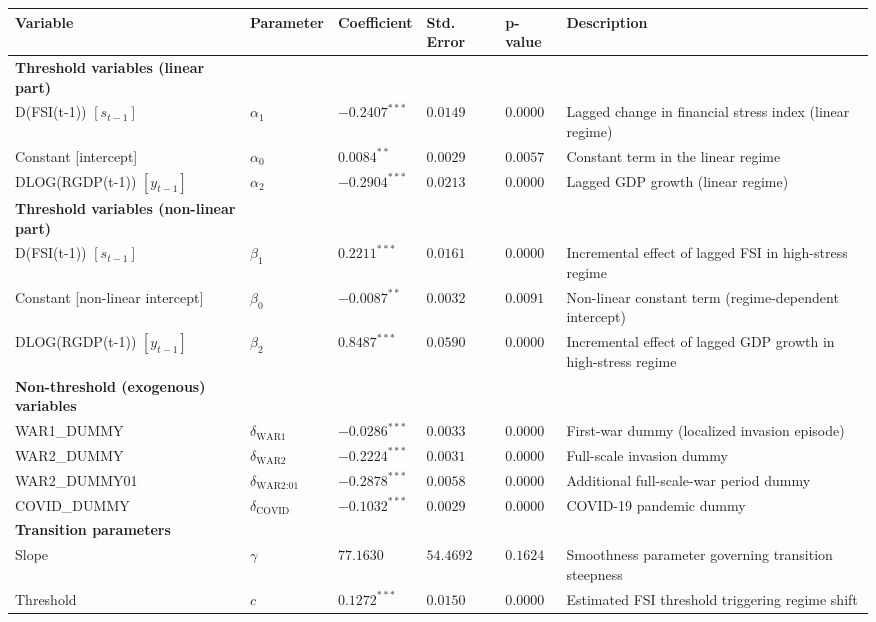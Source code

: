 \documentclass[12pt,preprint,aps,author-year]{revtex4-1}
\begin{document}
\begin{tabular}{|l|l|l|l|l|l|}
\hline
\textbf{Variable} & \textbf{Parameter} & \textbf{Coefficient} & \textbf{Std. Error} & \textbf{p-value} & \textbf{Description} \\ \hline
\textbf{Threshold variables (linear part)} &  &  &  &  &  \\ \hline
D(FSI(t-1)) $[s_{t-1}]$ & $\alpha_1$ & $-0.2407^{***}$ & $0.0149$ & $0.0000$ & Lagged change in financial stress index (linear regime) \\ \hline
Constant [intercept] & $\alpha_0$ & $0.0084^{**}$ & $0.0029$ & $0.0057$ & Constant term in the linear regime \\ \hline
DLOG(RGDP(t-1)) $[y_{t-1}]$ & $\alpha_2$ & $-0.2904^{***}$ & $0.0213$ & $0.0000$ & Lagged GDP growth (linear regime) \\ \hline
\textbf{Threshold variables (non-linear part)} &  &  &  &  &  \\ \hline
D(FSI(t-1)) $[s_{t-1}]$ & $\beta_1$ & $0.2211^{***}$ & $0.0161$ & $0.0000$ & Incremental effect of lagged FSI in high-stress regime \\ \hline
Constant [non-linear intercept] & $\beta_0$ & $-0.0087^{**}$ & $0.0032$ & $0.0091$ & Non-linear constant term (regime-dependent intercept) \\ \hline
DLOG(RGDP(t-1)) $[y_{t-1}]$ & $\beta_2$ & $0.8487^{***}$ & $0.0590$ & $0.0000$ & Incremental effect of lagged GDP growth in high-stress regime \\ \hline
\textbf{Non-threshold (exogenous) variables} &  &  &  &  &  \\ \hline
WAR1\_DUMMY & $\delta_{\text{WAR1}}$ & $-0.0286^{***}$ & $0.0033$ & $0.0000$ & First-war dummy (localized invasion episode) \\ \hline
WAR2\_DUMMY & $\delta_{\text{WAR2}}$ & $-0.2224^{***}$ & $0.0031$ & $0.0000$ & Full-scale invasion dummy \\ \hline
WAR2\_DUMMY01 & $\delta_{\text{WAR2:01}}$ & $-0.2878^{***}$ & $0.0058$ & $0.0000$ & Additional full-scale-war period dummy \\ \hline
COVID\_DUMMY & $\delta_{\text{COVID}}$ & $-0.1032^{***}$ & $0.0029$ & $0.0000$ & COVID-19 pandemic dummy \\ \hline
\textbf{Transition parameters} &  &  &  &  &  \\ \hline
Slope & $\gamma$ & $77.1630$ & $54.4692$ & $0.1624$ & Smoothness parameter governing transition steepness \\ \hline
Threshold & $c$ & $0.1272^{***}$ & $0.0150$ & $0.0000$ & Estimated FSI threshold triggering regime shift \\ \hline
\end{tabular}
\end{document}
